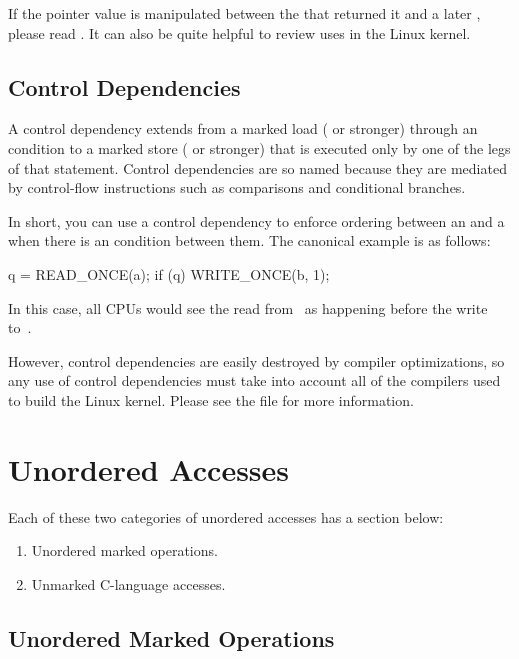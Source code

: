 If the pointer value is manipulated between the 
that returned it and a later , please read
.
It can also be quite helpful to review uses in the Linux kernel.


\subsection{Control Dependencies}

A control dependency extends from a marked load ( or stronger)
through an  condition to a marked store ( or stronger)
that is executed only by one of the legs of that  statement.
Control dependencies are so named because they are mediated by
control-flow instructions such as comparisons and conditional branches.

In short, you can use a control dependency to enforce ordering between
an  and a  when there is an  condition
between them.
The canonical example is as follows:

\begin{VerbatimU}
	q = READ_ONCE(a);
	if (q)
		WRITE_ONCE(b, 1);
\end{VerbatimU}

In this case, all CPUs would see the read from~ as happening before
the write to~.

However, control dependencies are easily destroyed by compiler
optimizations, so any use of control dependencies must take into account
all of the compilers used to build the Linux kernel.
Please see the  file for more information.


\section{Unordered Accesses}

Each of these two categories of unordered accesses has a section below:

\begin{enumerate}
 \item	Unordered marked operations.

 \item	Unmarked C-language accesses.
\end{enumerate}


\subsection{Unordered Marked Operations}

